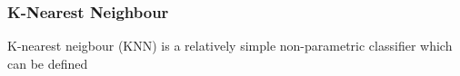 \subsubsection{K-Nearest Neighbour}

K-nearest neigbour (KNN) is a relatively simple non-parametric classifier which can be defined \cite{murphy2012machine}

